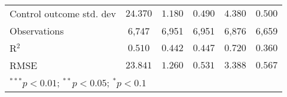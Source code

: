 \begin{table}
\begin{center}
\begin{tabular}{l c c c c c}
Control outcome std. dev                                                                     & $24.370$        & $1.180$                      & $0.490$        & $4.380$                       & $0.500$        \\
Observations                                                                                 & 6,747           & 6,951                        & 6,951          & 6,876                         & 6,659          \\
R$^{2}$                                                                                      & $0.510$         & $0.442$                      & $0.447$        & $0.720$                       & $0.360$        \\
RMSE                                                                                         & $23.841$        & $1.260$                      & $0.531$        & $3.388$                       & $0.567$        \\
\hline
\multicolumn{6}{l}{\scriptsize{$^{***}p<0.01$; $^{**}p<0.05$; $^{*}p<0.1$}}
\end{tabular}
\caption{}
\label{table:SI_table19_cw_het_B}
\end{center}
\end{table}
